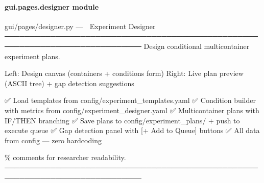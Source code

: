 \documentclass[letterpaper,10pt,english]{sphinxmanual}
\begin{document}
\paragraph{gui.pages.designer module}
\label{\detokenize{gui.pages.designer:module-gui.pages.designer}}\label{\detokenize{gui.pages.designer:gui-pages-designer-module}}\label{\detokenize{gui.pages.designer::doc}}
\sphinxAtStartPar
gui/pages/designer.py  —  🧪  Experiment Designer
─────────────────────────────────────────────────────────────────────────────
Design conditional multi\sphinxhyphen{}container experiment plans.
\begin{description}
\sphinxAtStartPar
Left:  Design canvas (containers + conditions form)
Right: Live plan preview (ASCII tree) + gap detection suggestions

\sphinxAtStartPar
✅ Load templates from config/experiment\_templates.yaml
✅ Condition builder with metrics from config/experiment\_designer.yaml
✅ Multi\sphinxhyphen{}container plans with IF/THEN branching
✅ Save plans to config/experiment\_plans/ + push to execute queue
✅ Gap detection panel with {[}+ Add to Queue{]} buttons
✅ All data from config — zero hardcoding

\end{description}

\% comments for researcher readability.
─────────────────────────────────────────────────────────────────────────────

\begin{fulllineitems}
\label{\detokenize{gui.pages.designer:gui.pages.designer.render}}
\pysigstartsignatures
\pysiglinewithargsret
{}
{}
{}
\pysigstopsignatures
\end{fulllineitems}


\sphinxstepscope
\end{document}
